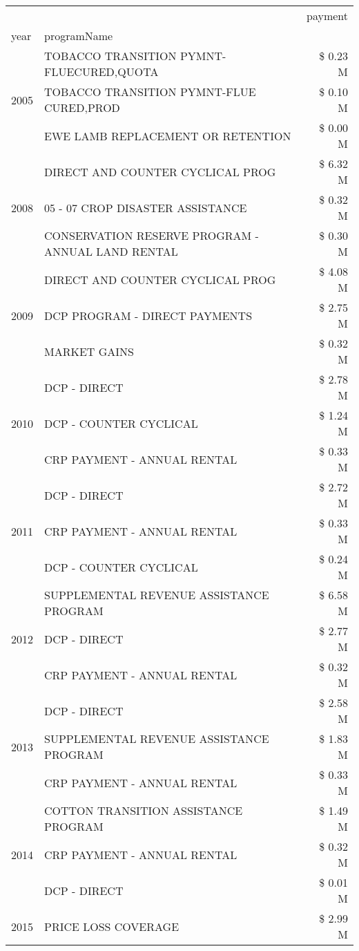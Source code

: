 \begin{tabular}{llr}
\toprule
 &  & payment \\
year & programName &  \\
\midrule
\multirow[t]{3}{*}{2005} & TOBACCO TRANSITION PYMNT-FLUECURED,QUOTA & \$ 0.23 M \\
 & TOBACCO TRANSITION PYMNT-FLUE CURED,PROD & \$ 0.10 M \\
 & EWE LAMB REPLACEMENT OR RETENTION & \$ 0.00 M \\
\cline{1-3}
\multirow[t]{3}{*}{2008} & DIRECT AND COUNTER CYCLICAL PROG & \$ 6.32 M \\
 & 05 - 07 CROP DISASTER ASSISTANCE & \$ 0.32 M \\
 & CONSERVATION RESERVE PROGRAM - ANNUAL LAND RENTAL & \$ 0.30 M \\
\cline{1-3}
\multirow[t]{3}{*}{2009} & DIRECT AND COUNTER CYCLICAL PROG & \$ 4.08 M \\
 & DCP PROGRAM - DIRECT PAYMENTS & \$ 2.75 M \\
 & MARKET GAINS & \$ 0.32 M \\
\cline{1-3}
\multirow[t]{3}{*}{2010} & DCP - DIRECT & \$ 2.78 M \\
 & DCP - COUNTER CYCLICAL & \$ 1.24 M \\
 & CRP PAYMENT - ANNUAL RENTAL & \$ 0.33 M \\
\cline{1-3}
\multirow[t]{3}{*}{2011} & DCP - DIRECT & \$ 2.72 M \\
 & CRP PAYMENT - ANNUAL RENTAL & \$ 0.33 M \\
 & DCP - COUNTER CYCLICAL & \$ 0.24 M \\
\cline{1-3}
\multirow[t]{3}{*}{2012} & SUPPLEMENTAL REVENUE ASSISTANCE PROGRAM & \$ 6.58 M \\
 & DCP - DIRECT & \$ 2.77 M \\
 & CRP PAYMENT - ANNUAL RENTAL & \$ 0.32 M \\
\cline{1-3}
\multirow[t]{3}{*}{2013} & DCP - DIRECT & \$ 2.58 M \\
 & SUPPLEMENTAL REVENUE ASSISTANCE PROGRAM & \$ 1.83 M \\
 & CRP PAYMENT - ANNUAL RENTAL & \$ 0.33 M \\
\cline{1-3}
\multirow[t]{3}{*}{2014} & COTTON TRANSITION ASSISTANCE PROGRAM & \$ 1.49 M \\
 & CRP PAYMENT - ANNUAL RENTAL & \$ 0.32 M \\
 & DCP - DIRECT & \$ 0.01 M \\
\cline{1-3}
\multirow[t]{3}{*}{2015} & PRICE LOSS COVERAGE & \$ 2.99 M \\

\end{tabular}
